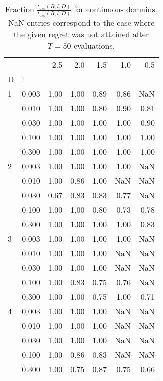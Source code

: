 \begin{table}
\centering
\caption{Fraction $\frac{t_{ucb}(R,l,D)}{t_{ucb}(R,l,D)}$ for 
    continuous domains. NaN entries correspond to the case where the 
    given regret was not attained after $T=50$ evaluations.}
\label{fig:continuous_ucb_vs_ucb2}
\begin{tabular}{llrrrrr}
\toprule
  &       &   2.5 &   2.0 &   1.5 &   1.0 &   0.5 \\
D & l &       &       &       &       &       \\
\midrule
1 & 0.003 &  1.00 &  1.00 &  0.89 &  0.86 &   NaN \\
  & 0.010 &  1.00 &  1.00 &  0.80 &  0.90 &  0.81 \\
  & 0.030 &  1.00 &  1.00 &  1.00 &  1.00 &  0.90 \\
  & 0.100 &  1.00 &  1.00 &  1.00 &  1.00 &  1.00 \\
  & 0.300 &  1.00 &  1.00 &  1.00 &  1.00 &  1.00 \\
2 & 0.003 &  1.00 &  1.00 &  1.00 &  1.00 &   NaN \\
  & 0.010 &  1.00 &  0.86 &  1.00 &   NaN &   NaN \\
  & 0.030 &  0.67 &  0.83 &  0.83 &  0.77 &   NaN \\
  & 0.100 &  1.00 &  1.00 &  0.80 &  0.73 &  0.78 \\
  & 0.300 &  1.00 &  1.00 &  1.00 &  1.00 &  0.83 \\
3 & 0.003 &  1.00 &  1.00 &  1.00 &  1.00 &   NaN \\
  & 0.010 &  1.00 &  1.00 &  1.00 &   NaN &   NaN \\
  & 0.030 &  1.00 &  1.00 &  1.00 &   NaN &   NaN \\
  & 0.100 &  1.00 &  0.83 &  0.75 &  0.76 &   NaN \\
  & 0.300 &  1.00 &  1.00 &  0.75 &  1.00 &  0.71 \\
4 & 0.003 &  1.00 &  1.00 &  1.00 &   NaN &   NaN \\
  & 0.010 &  1.00 &  1.00 &  1.00 &   NaN &   NaN \\
  & 0.030 &  1.00 &  1.00 &  1.00 &   NaN &   NaN \\
  & 0.100 &  1.00 &  0.86 &  0.83 &   NaN &   NaN \\
  & 0.300 &  1.00 &  0.75 &  0.87 &  0.75 &  0.66 \\
\bottomrule
\end{tabular}
\end{table}
